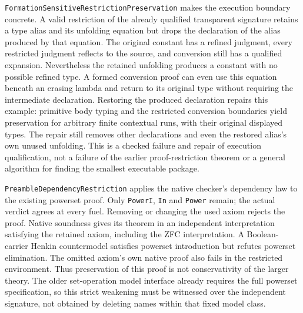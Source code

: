 \documentclass[11pt]{article}
\theoremstyle{definition}
\theoremstyle{remark}
\begin{document}
\nolinkurl{FormationSensitiveRestrictionPreservation} makes the execution
boundary concrete. A valid restriction of the already qualified transparent
signature retains a type alias and its unfolding equation but drops the
declaration of the alias produced by that equation. The original constant
has a refined judgment, every restricted judgment reflects to the source,
and conversion still has a qualified expansion. Nevertheless the retained
unfolding produces a constant with no possible refined type. A formed
conversion proof can even use this equation beneath an erasing lambda and
return to its original type without requiring the intermediate declaration.
Restoring the produced declaration repairs this example: primitive body
typing and the restricted conversion boundaries yield preservation for
arbitrary finite contextual runs, with their original displayed types.
The repair still removes other declarations and even the restored alias's
own unused unfolding. This is a checked failure and repair of execution
qualification, not a failure of the earlier proof-restriction theorem or
a general algorithm for finding the smallest executable package.

\nolinkurl{PreambleDependencyRestriction} applies the native checker's
dependency law to the existing powerset proof. Only \nolinkurl{PowerI},
\nolinkurl{In} and \nolinkurl{Power} remain; the actual verdict agrees at
every fuel. Removing or changing the used axiom rejects the proof.
Native soundness gives its theorem in an independent interpretation satisfying
the retained axiom, including the ZFC interpretation. A Boolean-carrier
Henkin countermodel satisfies powerset introduction but refutes powerset
elimination. The omitted axiom's own native proof also fails in the restricted
environment. Thus preservation of this proof is not conservativity of the
larger theory. The older set-operation model interface already requires the
full powerset specification, so this strict weakening must be witnessed over
the independent signature, not obtained by deleting names within that fixed
model class.
\end{document}
